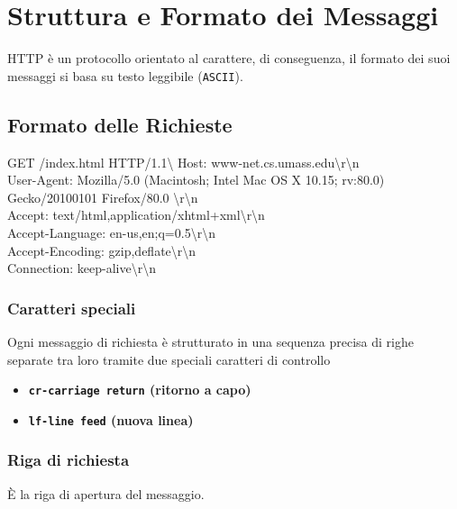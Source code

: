 \newpage

\section{Struttura e Formato dei Messaggi}
HTTP  è un protocollo orientato al carattere, di conseguenza, il formato dei suoi messaggi si basa su testo leggibile (\texttt{ASCII}).

\subsection{Formato delle Richieste}

    \begin{center}
        \begin{tcolorbox}[title=Esempio messaggio di richiesta]
        \ttfamily
        GET /index.html HTTP/1.1\textbackslash 
        Host: www-net.cs.umass.edu\textbackslash r\textbackslash n \\
        User-Agent: Mozilla/5.0 (Macintosh; Intel Mac OS X 10.15; rv:80.0) Gecko/20100101 Firefox/80.0 \textbackslash r\textbackslash n \\
        Accept: text/html,application/xhtml+xml\textbackslash r\textbackslash n \\
        Accept-Language: en-us,en;q=0.5\textbackslash r\textbackslash n \\
        Accept-Encoding: gzip,deflate\textbackslash r\textbackslash n \\
        Connection: keep-alive\textbackslash r\textbackslash n
    \end{tcolorbox}
    \end{center}

\subsubsection{Caratteri speciali}
Ogni messaggio di richiesta è strutturato in una sequenza precisa di righe separate tra loro tramite due speciali caratteri di controllo
    
    \begin{itemize}
        \item \textbf{\texttt{cr-carriage return} (ritorno a capo)}
        \item \textbf{\texttt{lf-line feed} (nuova linea)}
    \end{itemize}

\subsubsection{Riga di richiesta}
È la riga di apertura del messaggio.

